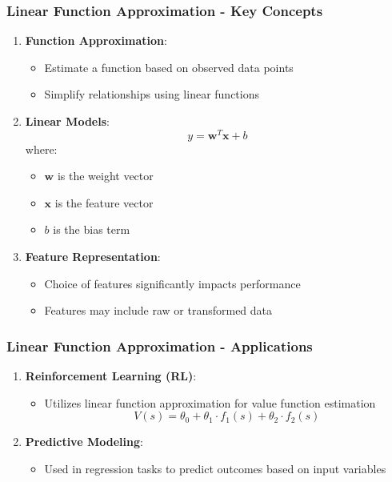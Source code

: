 \documentclass[aspectratio=169]{beamer}
\begin{document}
\begin{frame}[fragile]
    \frametitle{Linear Function Approximation - Key Concepts}
    \begin{enumerate}
        \item \textbf{Function Approximation}:
        \begin{itemize}
            \item Estimate a function based on observed data points
            \item Simplify relationships using linear functions
        \end{itemize}
        
        \item \textbf{Linear Models}:
        \begin{equation}
        y = \mathbf{w}^T \mathbf{x} + b
        \end{equation}
        where:
        \begin{itemize}
            \item \( \mathbf{w} \) is the weight vector
            \item \( \mathbf{x} \) is the feature vector
            \item \( b \) is the bias term
        \end{itemize}
        
        \item \textbf{Feature Representation}:
        \begin{itemize}
            \item Choice of features significantly impacts performance
            \item Features may include raw or transformed data
        \end{itemize}
    \end{enumerate}
\end{frame}

\begin{frame}[fragile]
    \frametitle{Linear Function Approximation - Applications}
    \begin{enumerate}
        \item \textbf{Reinforcement Learning (RL)}:
        \begin{itemize}
            \item Utilizes linear function approximation for value function estimation
            \begin{equation}
            V(s) = \theta_0 + \theta_1 \cdot f_1(s) + \theta_2 \cdot f_2(s)
            \end{equation}
        \end{itemize}
        
        \item \textbf{Predictive Modeling}:
        \begin{itemize}
            \item Used in regression tasks to predict outcomes based on input variables
        \end{itemize}
    \end{enumerate}
\end{frame}
\end{document}
